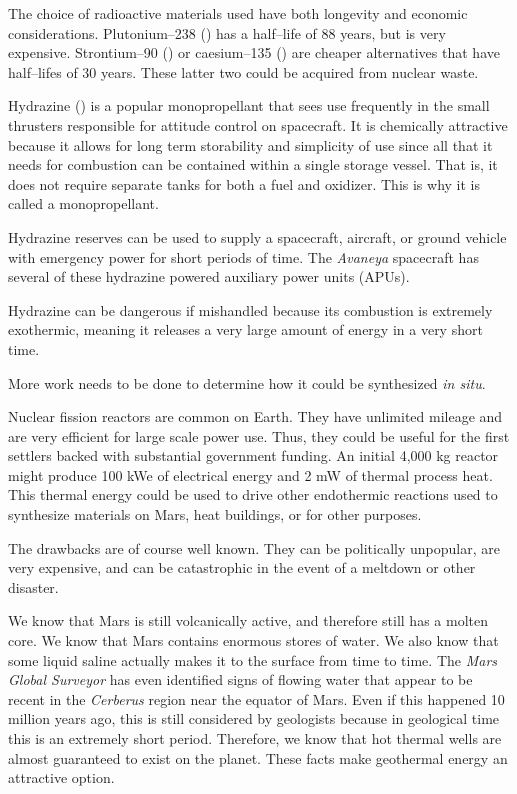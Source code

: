 The choice of radioactive materials used have both longevity and economic considerations. Plutonium--238 () has a half--life of 88 years, but is very expensive. Strontium--90 () or caesium--135 () are cheaper alternatives that have half--lifes of 30 years. These latter two could be acquired from nuclear waste.


Hydrazine () is a popular monopropellant that sees use frequently in the small thrusters responsible for attitude control on spacecraft. It is chemically attractive because it allows for long term storability and simplicity of use since all that it needs for combustion can be contained within a single storage vessel. That is, it does not require separate tanks for both a fuel and oxidizer. This is why it is called a monopropellant. 

Hydrazine reserves can be used to supply a spacecraft, aircraft, or ground vehicle with emergency power for short periods of time. The {\it Avaneya} spacecraft has several of these hydrazine powered auxiliary power units (APUs).

Hydrazine can be dangerous if mishandled because its combustion is extremely exothermic, meaning it releases a very large amount of energy in a very short time.

More work needs to be done to determine how it could be synthesized {\it in situ}.

Nuclear fission reactors are common on Earth. They have unlimited mileage and are very efficient for large scale power use. Thus, they could be useful for the first settlers backed with substantial government funding. An initial 4,000 kg reactor might produce 100 kWe of electrical energy and 2 mW of thermal process heat. This thermal energy could be used to drive other endothermic reactions used to synthesize materials on Mars, heat buildings, or for other purposes.

The drawbacks are of course well known. They can be politically unpopular, are very expensive, and can be catastrophic in the event of a meltdown or other disaster.

We know that Mars is still volcanically active, and therefore still has a molten core. We know that Mars contains enormous stores of water. We also know that some liquid saline actually makes it to the surface from time to time. The {\it Mars Global Surveyor} has even identified signs of flowing water that appear to be recent in the {\it Cerberus} region near the equator of Mars. Even if this happened 10 million years ago, this is still considered  by geologists because in geological time this is an extremely short period. Therefore, we know that hot thermal wells are almost guaranteed to exist on the planet. These facts make geothermal energy an attractive option.

